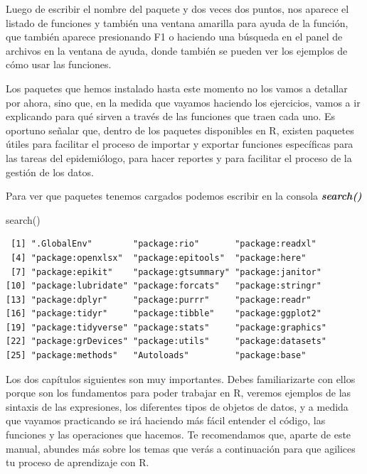 \documentclass[
  letterpaper,
  DIV=11,
  numbers=noendperiod]{scrreprt}
\newenvironment{Shaded}{\begin{snugshade}}{\end{snugshade}}
\newcommand{\FunctionTok}[1]{\textcolor[rgb]{0.28,0.35,0.67}{#1}}
\newcommand{\NormalTok}[1]{\textcolor[rgb]{0.00,0.23,0.31}{#1}}
\begin{document}
Luego de escribir el nombre del paquete y dos veces dos puntos, nos
aparece el listado de funciones y también una ventana amarilla para
ayuda de la función, que también aparece presionando F1 o haciendo una
búsqueda en el panel de archivos en la ventana de ayuda, donde también
se pueden ver los ejemplos de cómo usar las funciones.

Los paquetes que hemos instalado hasta este momento no los vamos a
detallar por ahora, sino que, en la medida que vayamos haciendo los
ejercicios, vamos a ir explicando para qué sirven a través de las
funciones que traen cada uno. Es oportuno señalar que, dentro de los
paquetes disponibles en R, existen paquetes útiles para facilitar el
proceso de importar y exportar funciones específicas para las tareas del
epidemiólogo, para hacer reportes y para facilitar el proceso de la
gestión de los datos.

Para ver que paquetes tenemos cargados podemos escribir en la consola
\textbf{\emph{search()}}

\begin{Shaded}
\begin{Highlighting}[]
\FunctionTok{search}\NormalTok{()}
\end{Highlighting}
\end{Shaded}

\begin{verbatim}
 [1] ".GlobalEnv"        "package:rio"       "package:readxl"   
 [4] "package:openxlsx"  "package:epitools"  "package:here"     
 [7] "package:epikit"    "package:gtsummary" "package:janitor"  
[10] "package:lubridate" "package:forcats"   "package:stringr"  
[13] "package:dplyr"     "package:purrr"     "package:readr"    
[16] "package:tidyr"     "package:tibble"    "package:ggplot2"  
[19] "package:tidyverse" "package:stats"     "package:graphics" 
[22] "package:grDevices" "package:utils"     "package:datasets" 
[25] "package:methods"   "Autoloads"         "package:base"     
\end{verbatim}

Los dos capítulos siguientes son muy importantes. Debes familiarizarte
con ellos porque son los fundamentos para poder trabajar en R, veremos
ejemplos de las sintaxis de las expresiones, los diferentes tipos de
objetos de datos, y a medida que vayamos practicando se irá haciendo más
fácil entender el código, las funciones y las operaciones que hacemos.
Te recomendamos que, aparte de este manual, abundes más sobre los temas
que verás a continuación para que agilices tu proceso de aprendizaje con
R.
\end{document}
